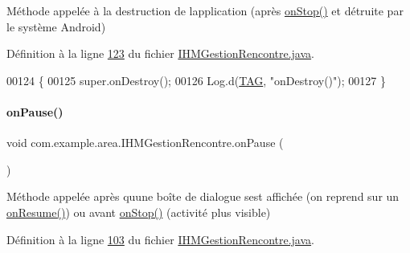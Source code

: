 Méthode appelée à la destruction de l\textquotesingle{}application (après \hyperlink{classcom_1_1example_1_1area_1_1_i_h_m_gestion_rencontre_abfee40a2616713d70c0245ae72c6d794}{on\+Stop()} et détruite par le système Android) 



Définition à la ligne \hyperlink{_i_h_m_gestion_rencontre_8java_source_l00123}{123} du fichier \hyperlink{_i_h_m_gestion_rencontre_8java_source}{I\+H\+M\+Gestion\+Rencontre.\+java}.


\begin{DoxyCode}
00124     \{
00125         super.onDestroy();
00126         Log.d(\hyperlink{classcom_1_1example_1_1area_1_1_i_h_m_gestion_rencontre_a0ac4d9152d48619cd697c8c69166219f}{TAG}, \textcolor{stringliteral}{"onDestroy()"});
00127     \}
\end{DoxyCode}
\mbox{\label{classcom_1_1example_1_1area_1_1_i_h_m_gestion_rencontre_a390adc8e9ec98d7147957ce8d9e1c071}} 
\paragraph{\texorpdfstring{on\+Pause()}{onPause()}}
{\footnotesize\ttfamily void com.\+example.\+area.\+I\+H\+M\+Gestion\+Rencontre.\+on\+Pause (\begin{DoxyParamCaption}{ }\end{DoxyParamCaption})\hspace{0.3cm}{\ttfamily [protected]}}



Méthode appelée après qu\textquotesingle{}une boîte de dialogue s\textquotesingle{}est affichée (on reprend sur un \hyperlink{classcom_1_1example_1_1area_1_1_i_h_m_gestion_rencontre_ad8a4a274c61458fe25a48ccba0d846e7}{on\+Resume()}) ou avant \hyperlink{classcom_1_1example_1_1area_1_1_i_h_m_gestion_rencontre_abfee40a2616713d70c0245ae72c6d794}{on\+Stop()} (activité plus visible) 



Définition à la ligne \hyperlink{_i_h_m_gestion_rencontre_8java_source_l00103}{103} du fichier \hyperlink{_i_h_m_gestion_rencontre_8java_source}{I\+H\+M\+Gestion\+Rencontre.\+java}.


